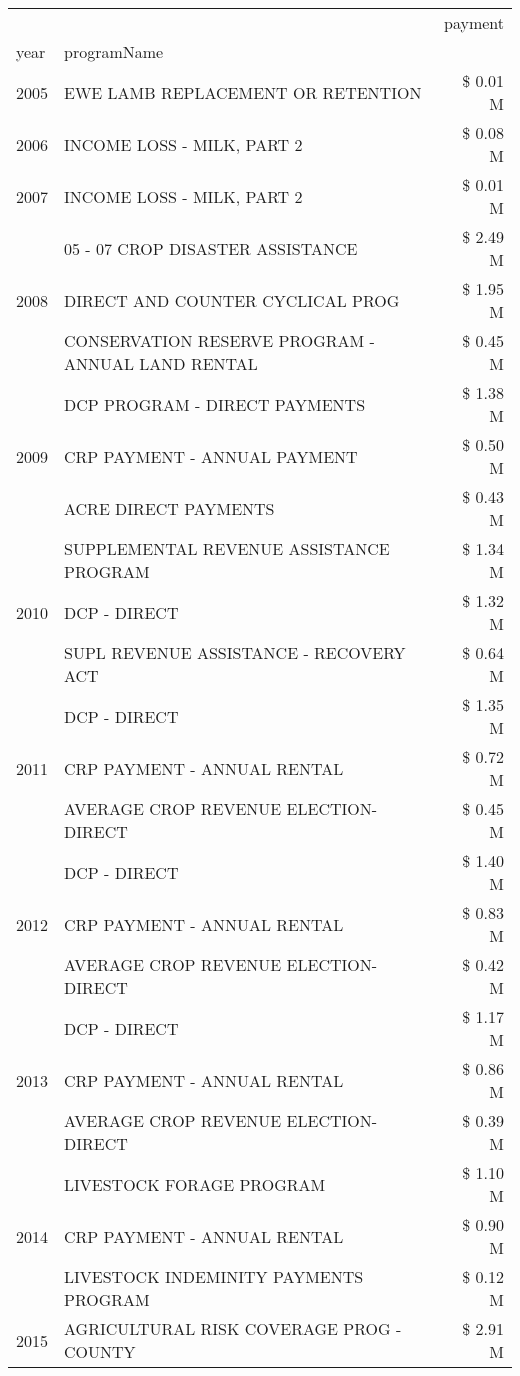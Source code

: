 \begin{tabular}{llr}
\toprule
 &  & payment \\
year & programName &  \\
\midrule
2005 & EWE LAMB REPLACEMENT OR RETENTION & \$ 0.01 M \\
\cline{1-3}
2006 & INCOME LOSS - MILK, PART 2 & \$ 0.08 M \\
\cline{1-3}
2007 & INCOME LOSS - MILK, PART 2 & \$ 0.01 M \\
\cline{1-3}
\multirow[t]{3}{*}{2008} & 05 - 07 CROP DISASTER ASSISTANCE & \$ 2.49 M \\
 & DIRECT AND COUNTER CYCLICAL PROG & \$ 1.95 M \\
 & CONSERVATION RESERVE PROGRAM - ANNUAL LAND RENTAL & \$ 0.45 M \\
\cline{1-3}
\multirow[t]{3}{*}{2009} & DCP PROGRAM - DIRECT PAYMENTS & \$ 1.38 M \\
 & CRP PAYMENT - ANNUAL PAYMENT & \$ 0.50 M \\
 & ACRE DIRECT PAYMENTS & \$ 0.43 M \\
\cline{1-3}
\multirow[t]{3}{*}{2010} & SUPPLEMENTAL REVENUE ASSISTANCE PROGRAM & \$ 1.34 M \\
 & DCP - DIRECT & \$ 1.32 M \\
 & SUPL REVENUE ASSISTANCE - RECOVERY ACT & \$ 0.64 M \\
\cline{1-3}
\multirow[t]{3}{*}{2011} & DCP - DIRECT & \$ 1.35 M \\
 & CRP PAYMENT - ANNUAL RENTAL & \$ 0.72 M \\
 & AVERAGE CROP REVENUE ELECTION-DIRECT & \$ 0.45 M \\
\cline{1-3}
\multirow[t]{3}{*}{2012} & DCP - DIRECT & \$ 1.40 M \\
 & CRP PAYMENT - ANNUAL RENTAL & \$ 0.83 M \\
 & AVERAGE CROP REVENUE ELECTION-DIRECT & \$ 0.42 M \\
\cline{1-3}
\multirow[t]{3}{*}{2013} & DCP - DIRECT & \$ 1.17 M \\
 & CRP PAYMENT - ANNUAL RENTAL & \$ 0.86 M \\
 & AVERAGE CROP REVENUE ELECTION-DIRECT & \$ 0.39 M \\
\cline{1-3}
\multirow[t]{3}{*}{2014} & LIVESTOCK FORAGE PROGRAM & \$ 1.10 M \\
 & CRP PAYMENT - ANNUAL RENTAL & \$ 0.90 M \\
 & LIVESTOCK INDEMINITY PAYMENTS PROGRAM & \$ 0.12 M \\
\cline{1-3}
\multirow[t]{3}{*}{2015} & AGRICULTURAL RISK COVERAGE PROG - COUNTY & \$ 2.91 M \\

\end{tabular}
